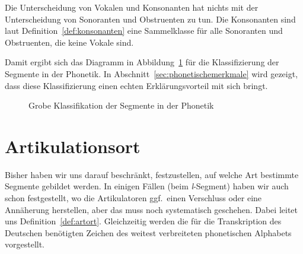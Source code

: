 Die Unterscheidung von Vokalen und Konsonanten hat nichts mit der Unterscheidung von Sonoranten und Obstruenten zu tun.
Die Konsonanten sind laut Definition~\ref{def:konsonanten} eine Sammelklasse für alle Sonoranten und Obstruenten, die keine Vokale sind.


Damit ergibt sich das Diagramm in Abbildung~\ref{fig:lautklassen} für die Klassifizierung der Segmente in der Phonetik.
In Abschnitt~\ref{sec:phonetischemerkmale} wird gezeigt, dass diese Klassifizierung einen echten Erklärungsvorteil mit sich bringt.

\begin{figure}[!htbp]
  \centering
  \caption{Grobe Klassifikation der Segmente in der Phonetik}
  \label{fig:lautklassen}
\end{figure}





\section{Artikulationsort}

\label{sec:artikulationsort}

Bisher haben wir uns darauf beschränkt, festzustellen, auf welche Art bestimmte Segmente gebildet werden.
In einigen Fällen (\zB beim \textit{l}-Segment) haben wir auch schon festgestellt, wo die Artikulatoren ggf.\ einen Verschluss oder eine Annäherung herstellen, aber das muss noch systematisch geschehen.
Dabei leitet uns Definition~\ref{def:artort}.
Gleichzeitig werden die für die Transkription des Deutschen benötigten Zeichen des weitest verbreiteten phonetischen Alphabets vorgestellt.

